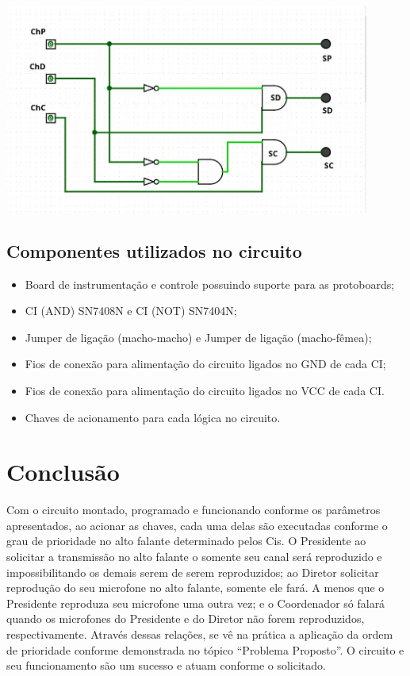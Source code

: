 \documentclass{article}
\begin{document}
\begin{center}
\includegraphics[width=0.9\textwidth]{circuito}
\end{center}

\subsection{Componentes utilizados no circuito}
\begin{itemize}
	\item Board de instrumentação e controle possuindo suporte para as protoboards;
	\item CI (AND) SN7408N e CI (NOT) SN7404N;
	\item Jumper de ligação (macho-macho) e Jumper de ligação (macho-fêmea);
	\item Fios de conexão para alimentação do circuito ligados no GND de cada CI; 
	\item Fios de conexão para alimentação do circuito ligados no VCC de cada CI.
	\item Chaves de acionamento para cada lógica no circuito.
\end{itemize}

\section{Conclusão}

Com o circuito montado, programado e funcionando conforme os parâmetros apresentados, ao acionar as chaves, cada uma delas são executadas conforme o grau de prioridade no alto falante determinado pelos Cis. O Presidente ao solicitar a transmissão no alto falante o somente seu canal será reproduzido e impossibilitando os demais serem de serem reproduzidos; ao Diretor solicitar reprodução do seu microfone no alto falante, somente ele fará. A menos que o Presidente reproduza seu microfone uma outra vez; e o Coordenador só falará quando os microfones do Presidente e do Diretor não forem reproduzidos, respectivamente. Através dessas relações, se vê na prática a aplicação da ordem de prioridade conforme demonstrada no tópico ``Problema Proposto''. O circuito e seu funcionamento são um sucesso e atuam conforme o solicitado.
\end{document}
